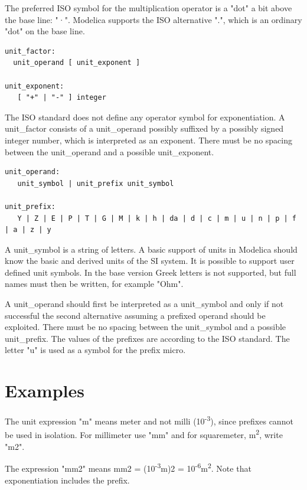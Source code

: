\documentclass[10pt,a4paper]{report}
\def\doublelabel#1{\label{#1}\hypertarget{#1}{}}
\begin{document}
The preferred ISO symbol for the multiplication operator is a "dot" a
bit above the base line: "·". Modelica supports the ISO alternative ".",
which is an ordinary "dot" on the base line.

\begin{lstlisting}[language=grammar]
unit_factor:
  unit_operand [ unit_exponent ]

unit_exponent:
   [ "+" | "-" ] integer
\end{lstlisting}

The ISO standard does not define any operator symbol for exponentiation.
A unit\_factor consists of a unit\_operand possibly suffixed by a
possibly signed integer number, which is interpreted as an exponent.
There must be no spacing between the unit\_operand and a possible
unit\_exponent.

\begin{lstlisting}[language=grammar]
unit_operand:
   unit_symbol | unit_prefix unit_symbol

unit_prefix:
   Y | Z | E | P | T | G | M | k | h | da | d | c | m | u | n | p | f | a | z | y
\end{lstlisting}

A unit\_symbol is a string of letters. A basic support of units in
Modelica should know the basic and derived units of the SI system. It is
possible to support user defined unit symbols. In the base version Greek
letters is not supported, but full names must then be written, for
example "Ohm".

A unit\_operand should first be interpreted as a unit\_symbol and only
if not successful the second alternative assuming a prefixed operand
should be exploited. There must be no spacing between the unit\_symbol
and a possible unit\_prefix. The values of the prefixes are according to
the ISO standard. The letter "u" is used as a symbol for the prefix
micro.

\section{Examples}\doublelabel{examples2}

The unit expression "m" means meter and not milli
(10\textsuperscript{-3}), since prefixes cannot be used in isolation.
For millimeter use "mm" and for squaremeter, m\textsuperscript{2}, write
"m2".

The expression "mm2" means mm2 = (10\textsuperscript{-3}m)2 =
10\textsuperscript{-6}m\textsuperscript{2}. Note that exponentiation
includes the prefix.
\end{document}
